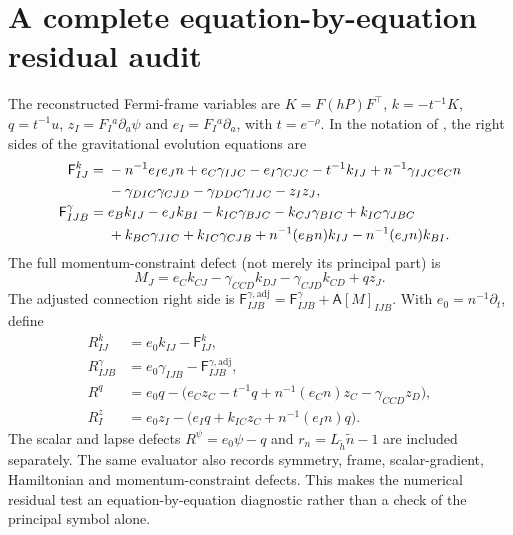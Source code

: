 \documentclass[11pt,a4paper]{article}
\theoremstyle{remark}
\begin{document}
\section{A complete equation-by-equation residual audit}
\label{sec:complete-residual}
The reconstructed Fermi-frame variables are
$K=F(hP)F^\top$, $k=-t^{-1}K$, $q=t^{-1}u$, $z_I=F_I{}^a\partial_a\psi$ and $e_I=F_I{}^a\partial_a$, with $t=e^{-\rho}$. In the notation of \cite{FRS}, the right sides of the gravitational evolution equations are
\begin{align}
\mathsf F^k_{IJ}={}&-n^{-1}e_Ie_Jn+e_C\gamma_{IJC}-e_I\gamma_{CJC}-t^{-1}k_{IJ}
+n^{-1}\gamma_{IJC}e_Cn\notag\\
&-\gamma_{DIC}\gamma_{CJD}-\gamma_{DDC}\gamma_{IJC}-z_Iz_J,\label{eq:newFk}\\
\mathsf F^\gamma_{IJB}={}&e_Bk_{IJ}-e_Jk_{BI}-k_{IC}\gamma_{BJC}-k_{CJ}\gamma_{BIC}
+k_{IC}\gamma_{JBC}\notag\\
&+k_{BC}\gamma_{JIC}+k_{IC}\gamma_{CJB}
+n^{-1}(e_Bn)k_{IJ}-n^{-1}(e_Jn)k_{BI}.\label{eq:newFg}
\end{align}
The full momentum-constraint defect (not merely its principal part) is
\[
M_J=e_Ck_{CJ}-\gamma_{CCD}k_{DJ}-\gamma_{CJD}k_{CD}+qz_J.
\]
The adjusted connection right side is $\mathsf F^{\gamma,\mathrm{adj}}_{IJB}=\mathsf F^\gamma_{IJB}+\mathsf A[M]_{IJB}$. With $e_0=n^{-1}\partial_t$, define
\begin{align}\label{eq:newresiduals}
R^k_{IJ}&=e_0k_{IJ}-\mathsf F^k_{IJ},\nonumber\\
R^\gamma_{IJB}&=e_0\gamma_{IJB}-\mathsf F^{\gamma,\mathrm{adj}}_{IJB},\\
R^q&=e_0q-\bigl(e_Cz_C-t^{-1}q+n^{-1}(e_Cn)z_C-\gamma_{CCD}z_D\bigr),\nonumber\\
R^z_I&=e_0z_I-\bigl(e_Iq+k_{IC}z_C+n^{-1}(e_In)q\bigr).\nonumber
\end{align}
The scalar and lapse defects $R^\psi=e_0\psi-q$ and $r_n=L_{\widetilde h}\widetilde n-1$ are included separately. The same evaluator also records symmetry, frame, scalar-gradient, Hamiltonian and momentum-constraint defects. This makes the numerical residual test an equation-by-equation diagnostic rather than a check of the principal symbol alone.
\end{document}
